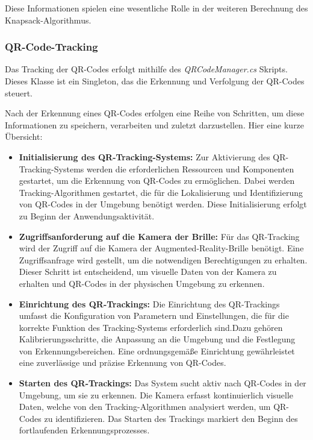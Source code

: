Diese Informationen spielen eine wesentliche Rolle in der weiteren Berechnung des Knapsack-Algorithmus.

\subsubsection{QR-Code-Tracking}
Das Tracking der QR-Codes erfolgt mithilfe des \textit{QRCodeManager.cs} Skripts. Dieses Klasse ist ein Singleton, das
die Erkennung und Verfolgung der QR-Codes steuert.

Nach der Erkennung eines QR-Codes erfolgen eine Reihe von Schritten, um diese Informationen zu speichern, verarbeiten
und zuletzt darzustellen.
Hier eine kurze Übersicht:
\begin{itemize}

\item \textbf{Initialisierung des QR-Tracking-Systems:}
Zur Aktivierung des QR-Tracking-Systems werden die erforderlichen Ressourcen und Komponenten gestartet, um die Erkennung
von QR-Codes zu ermöglichen. Dabei werden Tracking-Algorithmen gestartet, die für die Lokalisierung und Identifizierung
von QR-Codes in der Umgebung benötigt werden. Diese Initialisierung erfolgt zu Beginn der Anwendungsaktivität.

\item \textbf{Zugriffsanforderung auf die Kamera der Brille:}
Für das QR-Tracking wird der Zugriff auf die Kamera der Augmented-Reality-Brille benötigt. Eine Zugriffsanfrage wird
gestellt, um die notwendigen Berechtigungen zu erhalten. Dieser Schritt ist entscheidend, um visuelle Daten von der Kamera
zu erhalten und QR-Codes in der physischen Umgebung zu erkennen.

\item \textbf{Einrichtung des QR-Trackings:}
Die Einrichtung des QR-Trackings umfasst die Konfiguration von Parametern und Einstellungen, die für die korrekte
Funktion des Tracking-Systems erforderlich sind.Dazu gehören Kalibrierungsschritte, die Anpassung an die Umgebung und die
Festlegung von Erkennungsbereichen. Eine ordnungsgemäße Einrichtung gewährleistet eine zuverlässige und präzise Erkennung von QR-Codes.

\item \textbf{Starten des QR-Trackings:}
Das System sucht aktiv nach QR-Codes in der Umgebung, um sie zu erkennen. Die Kamera erfasst kontinuierlich visuelle
Daten, welche von den Tracking-Algorithmen analysiert werden, um QR-Codes zu identifizieren. Das Starten des Trackings
markiert den Beginn des fortlaufenden Erkennungsprozesses.


\end{itemize}
